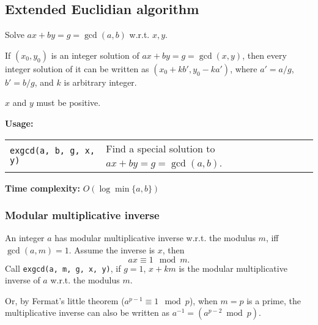\subsection{Extended Euclidian algorithm} %
Solve $ax + by = g = \gcd(a,b)$ w.r.t. $x, y$. \par
If $(x_0, y_0)$ is an integer solution of $ax + by = g = \gcd(x,y)$, then every integer solution of it can be written as $(x_0 + kb', y_0 - ka')$, where $a' = a/g$, $b' = b/g$, and $k$ is arbitrary integer. \par
\Warning $x$ and $y$ must be positive. \par
\textbf{Usage:} \\[0.1cm]
\begin{tabular}{p{4cm} p{7cm}}
  \lstinline|exgcd(a, b, g, x, y)| & Find a special solution to $ax + by = g = \gcd(a, b)$. \\
\end{tabular} \par
\textbf{Time complexity:} $O(\log \min \{a,b\})$ \par


\subsubsection{Modular multiplicative inverse}
An integer $a$ has modular multiplicative inverse w.r.t. the modulus $m$, iff $\gcd(a, m) = 1$. Assume the inverse is $x$, then
$$ ax \equiv 1 \mod m \text{.}$$
Call \lstinline|exgcd(a, m, g, x, y)|, if $g = 1$, $x + km$ is the modular multiplicative inverse of $a$ w.r.t. the modulus $m$. \par
 \par
Or, by Fermat's little theorem ($a^{p-1} \equiv 1 \mod p$), when $m=p$ is a prime, the multiplicative inverse can also be written as
$a^{-1} = \left(a^{p-2} \bmod p\right) \text{.}$

